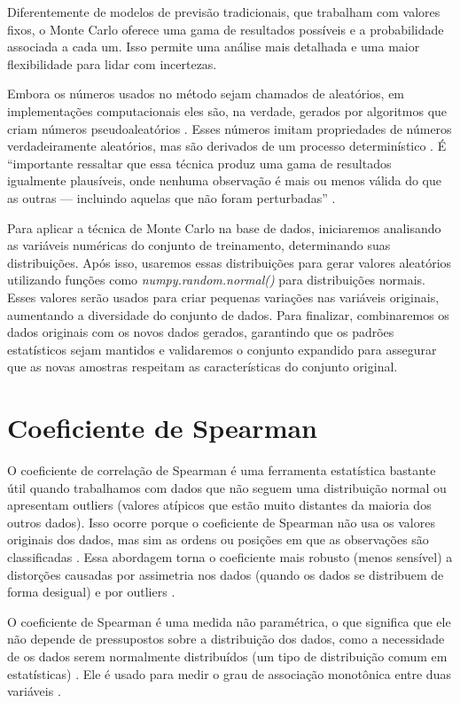 \begin{apendicesenv}
Diferentemente de modelos de previsão tradicionais, que trabalham com valores fixos, o Monte Carlo oferece uma gama de resultados possíveis e a probabilidade associada a cada um. Isso permite uma análise mais detalhada e uma maior flexibilidade para lidar com incertezas.

Embora os números usados no método sejam chamados de aleatórios, em implementações computacionais eles são, na verdade, gerados por algoritmos que criam números pseudoaleatórios \cite{kalos2009}. Esses números imitam propriedades de números verdadeiramente aleatórios, mas são derivados de um processo determinístico \cite{kalos2009}. É “importante ressaltar que essa técnica produz uma gama de resultados igualmente plausíveis, onde nenhuma observação é mais ou menos válida do que as outras --- incluindo aquelas que não foram perturbadas” \cite{kiar2021}.

Para aplicar a técnica de Monte Carlo na base de dados, iniciaremos analisando as variáveis numéricas do conjunto de treinamento, determinando suas distribuições. Após isso, usaremos essas distribuições para gerar valores aleatórios utilizando funções como \textit{numpy.random.normal()} para distribuições normais. Esses valores serão usados para criar pequenas variações nas variáveis originais, aumentando a diversidade do conjunto de dados. Para finalizar, combinaremos os dados originais com os novos dados gerados, garantindo que os padrões estatísticos sejam mantidos e validaremos o conjunto expandido para assegurar que as novas amostras respeitam as características do conjunto original.

\chapter{Coeficiente de Spearman}

O coeficiente de correlação de Spearman é uma ferramenta estatística bastante útil quando trabalhamos com dados que não seguem uma distribuição normal ou apresentam outliers (valores atípicos que estão muito distantes da maioria dos outros dados). Isso ocorre porque o coeficiente de Spearman não usa os valores originais dos dados, mas sim as ordens ou posições em que as observações são classificadas \cite{sousa2019}. Essa abordagem torna o coeficiente mais robusto (menos sensível) a distorções causadas por assimetria nos dados (quando os dados se distribuem de forma desigual) e por outliers \cite{sousa2019}.

O coeficiente de Spearman é uma medida não paramétrica, o que significa que ele não depende de pressupostos sobre a distribuição dos dados, como a necessidade de os dados serem normalmente distribuídos (um tipo de distribuição comum em estatísticas) \cite{restrepo2007}. Ele é usado para medir o grau de associação monotônica entre duas variáveis \cite{restrepo2007}.


\end{apendicesenv}
